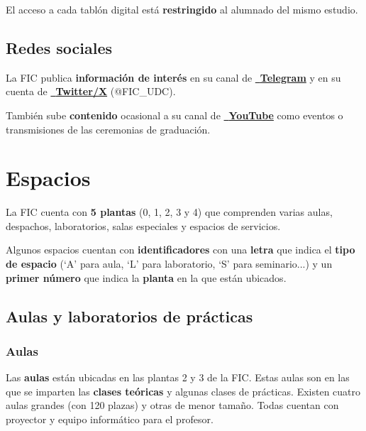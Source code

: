 \begin{warningBox}
    El acceso a cada tablón digital está \textbf{restringido} al alumnado del mismo estudio.
\end{warningBox}

\subsection{Redes sociales}

La \acrshort{FIC} publica \textbf{información de interés} en su canal de \href{https://t.me/+LHa3QApmGskyNDFk}{~\textbf{Telegram}} y en su cuenta de \href{https://x.com/FIC_UDC}{~\textbf{Twitter/X}} (@FIC\_UDC).

También sube \textbf{contenido} ocasional a su canal de \href{https://www.youtube.com/@facultaddeinformaticadeaco4211}{~\textbf{YouTube}} como eventos o transmisiones de las ceremonias de graduación.


\section{Espacios}

La \acrshort{FIC} cuenta con \textbf{5 plantas} (0, 1, 2, 3 y 4) que comprenden varias aulas, despachos, laboratorios, salas especiales y espacios de servicios.

\begin{infoBox}
    Algunos espacios cuentan con \textbf{identificadores} con una \textbf{letra} que indica el \textbf{tipo de espacio} (`A' para aula, `L' para laboratorio, `S' para seminario...) y un \textbf{primer número} que indica la \textbf{planta} en la que están ubicados.
\end{infoBox}

\subsection{Aulas y laboratorios de prácticas}

\subsubsection{Aulas}

Las \textbf{aulas} están ubicadas en las plantas 2 y 3 de la 
\acrshort{FIC}. Estas aulas son en las que se imparten las \textbf{clases teóricas} y algunas clases de prácticas. Existen cuatro aulas grandes (con 120 plazas) y otras de menor tamaño. Todas cuentan con proyector y equipo informático para el profesor.

